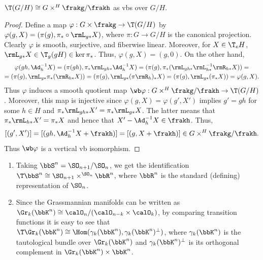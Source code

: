 \begin{prop}\label{prop 4.5.1 Sharpe}
    $\T(G\slash H)\cong G\times^H \frakg\slash\frakh$ as \glspl{vb} over $G\slash H$.
\end{prop}
\begin{proof}
    Define a map $\varphi:G\times \frakg\to \T(G\slash H)$ by $\varphi(g, X)=(\pi(g),\pi_\ast \circ \rmL_{g\ast}X)$, where $\pi:G\to G\slash H$ is the canonical projection. Clearly $\varphi$ is smooth, surjective, and fiberwise linear. Moreover, for $X\in \T_eH$, $\rmL_{g\ast}X\in \T_g(gH)\in\ker\pi_\ast$. Thus, $\varphi(g, X)=(g,0)$. On the other hand,
    \begin{multline}
        \varphi(gh,\Ad_h^{-1}X)=(\pi(gh),\pi_\ast \rmL_{gh\ast}\Ad_h^{-1}X)=(\pi(g),\pi_\ast(\rmL_{gh\ast}\rmL_{h\ast}^{-1} \rmR_{h\ast}X))=\\
        =(\pi(g),\rmL_{g\ast }\pi_\ast (\rmR_{h\ast}X))=(\pi(g),\rmL_{g\ast}(\pi \rmR_h)_\ast X)
        =(\pi(g),\rmL_{g\ast}(\pi_\ast X))=\varphi(g,X).
    \end{multline}
    Thus $\varphi$ induces a smooth quotient map $\wb\varphi:G\times^H \frakg\slash\frakh\to \T(G\slash H)$. Moreover, this map is injective since $\varphi(g,X)=\varphi(g',X')$ implies $g'=gh$ for some $h\in H$ and $\pi_\ast \rmL_{gh\ast}X'=\pi_\ast \rmL_{g\ast}X$. The latter means that $\pi_\ast \rmL_{h\ast}X'=\pi_\ast X$ and hence that $X'-\Ad_h^{-1}X\in\frakh$. Thus,
    \[[(g',X')]=[(gh,\Ad_h^{-1}X+\frakh)]=[(g,X+\frakh)]\in G\times^H\frakg\slash\frakh.\]
    Thus $\wb\varphi$ is a vertical \gls{vb} isomorphism.
\end{proof}


\begin{example}
    \begin{enumerate}
        \item Taking $\bbS^n=\SO_{n+1}\slash \SO_n$, we get the identification $\T\bbS^n\cong \SO_{n+1}\times^{\SO_n}\bbR^n$, where $\bbR^n$ is the standard (defining) representation of $\SO_n$.
        \item Since the Grassmannian manifolds can be written as $\Gr_k(\bbK^n)\cong \calO_n\slash (\calO_{n-k}\times \calO_{k})$, by comparing transition functions it is easy to see that $\T\Gr_k(\bbK^n)\cong \Hom(\gamma_k(\bbK^n),\gamma_k(\bbK^n)^\perp)$, where $\gamma_k(\bbK^n)$ is the tautological bundle over $\Gr_k(\bbK^n)$ and $\gamma_k(\bbK^n)^\perp$ is its orthogonal complement in $\Gr_k(\bbK^n)\times \bbK^n$.
    \end{enumerate}
\end{example}


